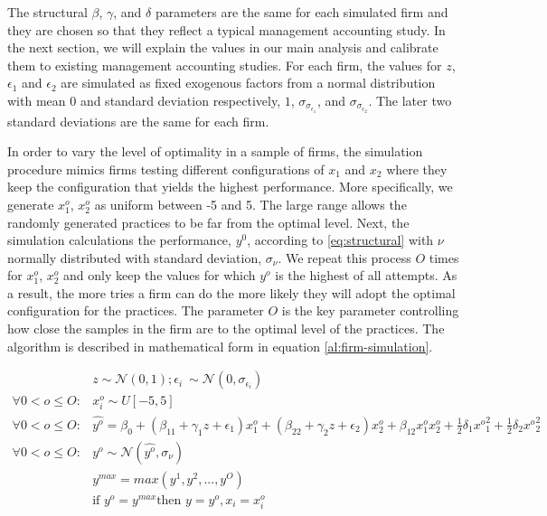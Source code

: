 \documentclass[12pt]{article}
\begin{document}
The structural $\beta$, $\gamma$, and $\delta$ parameters are the same for each simulated firm and they are chosen so that they reflect a typical management accounting study. In the next section, we will explain the values in our main analysis and calibrate them to existing management accounting studies. For each firm, the values for $z$, $\epsilon_1$ and $\epsilon_2$ are simulated as fixed exogenous factors from a normal distribution with mean $0$ and standard deviation respectively, $1$,  $\sigma_{\sigma_{\epsilon_1}}$, and $\sigma_{\sigma_{\epsilon_2}}$. The later two standard deviations are the same for each firm. 

In order to vary the level of optimality in a sample of firms, the simulation procedure mimics firms testing different configurations of $x_1$ and $x_2$ where they keep the configuration that yields the highest performance. More specifically, we generate \(x^o_{1}\), \(x^o_{2}\) as uniform between -5 and 5. The large range allows the randomly generated practices to be far from the optimal level.  Next, the simulation calculations the performance, $y^0$, according to \eqref{eq:structural} with $\nu$ normally distributed with standard deviation, $\sigma_{\nu}$. We repeat this process $O$ times for \(x^o_{1}\), \(x^o_{2}\) and only keep the values for which $y^o$ is the highest of all attempts. As a result, the more tries a firm can do the more likely they will adopt the optimal configuration for the practices. The parameter $O$ is the key parameter controlling how close the samples in the firm are to the optimal level of the practices. The algorithm is described in mathematical form in equation \eqref{al:firm-simulation}. 

\begin{equation}\label{al:firm-simulation}
\begin{aligned}
	&z \sim \mathcal{N}(0, 1); \epsilon_i ~ \sim \mathcal{N}(0, \sigma_{\epsilon_i}) \\
    \forall 0 < o \leq O: &x^o_i \sim U[-5,5] \\
    \forall 0 < o \leq O: &\hat{y^o} = \beta_0 + (\beta_{11} + \gamma_1 z + \epsilon_1) x^o_1 
						+ (\beta_{22} + \gamma_2 z  + \epsilon_2) x^o_2 
                        + \beta_{12} x^o_1 x^o_2 + \frac{1}{2}\delta_1 {x^o}^2_1 + \frac{1}{2}\delta_2 {x^o}^2_2 \\
     \forall 0 < o \leq O: &y^o \sim \mathcal{N}(\hat{y^o}, \sigma_{\nu}) \\
	 &y^{max} = max(y^1, y^2, ..., y^O)  \\
     &\text{if } y^o = y^{max} \text{then } y = y^o, x_i = x^o_i
\end{aligned}
\end{equation}
\end{document}
